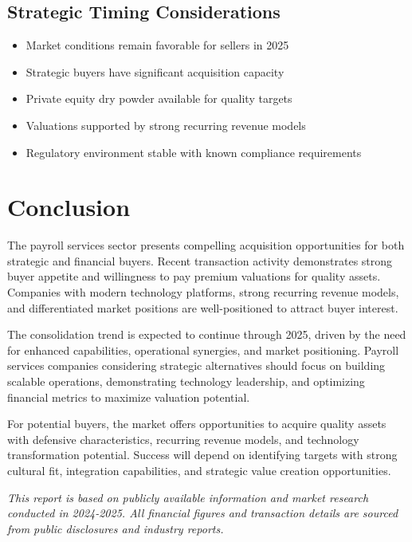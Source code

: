 \documentclass[12pt,a4paper]{article}
\begin{document}
\subsection{Strategic Timing Considerations}

\begin{itemize}
    \item Market conditions remain favorable for sellers in 2025
    \item Strategic buyers have significant acquisition capacity
    \item Private equity dry powder available for quality targets
    \item Valuations supported by strong recurring revenue models
    \item Regulatory environment stable with known compliance requirements
\end{itemize}

\section{Conclusion}

The payroll services sector presents compelling acquisition opportunities for both strategic and financial buyers. Recent transaction activity demonstrates strong buyer appetite and willingness to pay premium valuations for quality assets. Companies with modern technology platforms, strong recurring revenue models, and differentiated market positions are well-positioned to attract buyer interest.

The consolidation trend is expected to continue through 2025, driven by the need for enhanced capabilities, operational synergies, and market positioning. Payroll services companies considering strategic alternatives should focus on building scalable operations, demonstrating technology leadership, and optimizing financial metrics to maximize valuation potential.

For potential buyers, the market offers opportunities to acquire quality assets with defensive characteristics, recurring revenue models, and technology transformation potential. Success will depend on identifying targets with strong cultural fit, integration capabilities, and strategic value creation opportunities.

\vspace{1cm}

\textit{This report is based on publicly available information and market research conducted in 2024-2025. All financial figures and transaction details are sourced from public disclosures and industry reports.}
\end{document}
